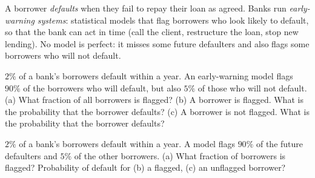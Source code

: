 
\begin{problem}
	\begin{context}
		A borrower \emph{defaults} when they fail to repay their loan as agreed.
		Banks run \emph{early-warning systems}: statistical models that flag
		borrowers who look likely to default, so that the bank can act in time
		(call the client, restructure the loan, stop new lending). No model is
		perfect: it misses some future defaulters and also flags some
		borrowers who will not default.
	\end{context}
	$2\%$ of a bank's borrowers default within a year. An early-warning model
	flags $90\%$ of the borrowers who will default, but also $5\%$ of those who
	will not default.
	(a) What fraction of all borrowers is flagged?
	(b) A borrower is flagged. What is the probability that the borrower
	defaults?
	(c) A borrower is not flagged. What is the probability that the borrower
	defaults?
\end{problem}

\begin{slideproblem}
	$2\%$ of a bank's borrowers default within a year. A model flags $90\%$ of
	the future defaulters and $5\%$ of the other borrowers. (a) What fraction
	of borrowers is flagged? Probability of default for (b) a flagged, (c) an
	unflagged borrower?
\end{slideproblem}

